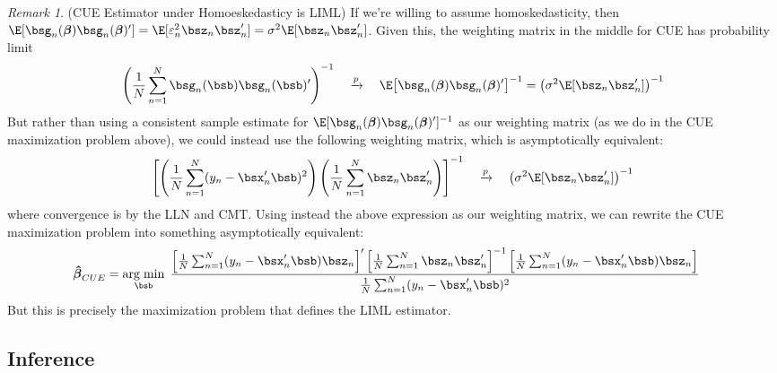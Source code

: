 \documentclass[12pt]{article}
\theoremstyle{plain}
\theoremstyle{definition}
\theoremstyle{remark}
\newtheorem*{rmk}{Remark}
\newcommand{\ra}{\rightarrow}
\newcommand{\bsbeta}{\boldsymbol{\beta}}
\newcommand{\bshatbeta}{\boldsymbol{\hat{\beta}}}
\DeclareMathOperator*{\argmin}{arg\;min}
\newcommand{\pto}{\xrightarrow{p}}
\newcommand{\sumnN}{\sum^N_{n=1}}
\begin{document}
\begin{rmk}(CUE Estimator under Homoeskedasticy is LIML)
If we're willing to assume homoskedasticity, then
$\E[\bsg_n(\bsbeta)\bsg_n(\bsbeta)']=\E[\varepsilon_n^2\bsz_n\bsz_n']=\sigma^2
\E[\bsz_n\bsz_n']$. Given this,
the weighting matrix in the middle for CUE has probability limit
\begin{align}
  \left(
  \frac{1}{N}\sumnN
  \bsg_n(\bsb)\bsg_n(\bsb)'
  \right)^{-1}
  \quad \pto\quad
  \E\big[
  \bsg_n(\bsbeta)\bsg_n(\bsbeta)'
  \big]^{-1} =
  \left(\sigma^2 \E[\bsz_n\bsz_n']\right)^{-1}
  \label{sendog:cue}
\end{align}
But rather than using a consistent sample estimate for
$\E[\bsg_n(\bsbeta)\bsg_n(\bsbeta)']^{-1}$ as our weighting matrix (as
we do in the CUE maximization problem above), we could instead use the
following weighting matrix, which is asymptotically equivalent:
\begin{align*}
  \left[
    \left(
      \frac{1}{N}\sumnN (y_n-\bsx_n'\bsb)^2
    \right)
    \left(
      \frac{1}{N}\sumnN \bsz_n\bsz_n'
    \right)
  \right]^{-1}
  \quad\pto\quad
  \left(\sigma^2 \E[\bsz_n\bsz_n']\right)^{-1}
\end{align*}
where convergence is by the LLN and CMT.
Using instead the above expression as our weighting matrix, we can
rewrite the CUE maximization problem into something asymptotically
equivalent:
\begin{align*}
  \bshatbeta_{CUE} &=
  \argmin_{\bsb}\;
  \frac{%
  \left[
  \frac{1}{N} \sumnN (y_n-\bsx_n'\bsb)\bsz_n
  \right]'
  \left[
    \frac{1}{N}\sumnN \bsz_n\bsz_n'
  \right]^{-1}
  \left[
  \frac{1}{N} \sumnN (y_n-\bsx_n'\bsb)\bsz_n
  \right]
  }{\frac{1}{N}\sumnN (y_n-\bsx_n'\bsb)^2}
\end{align*}
But this is precisely the maximization problem that defines the LIML
estimator.
\end{rmk}



\clearpage
\subsection{Inference}
\end{document}
